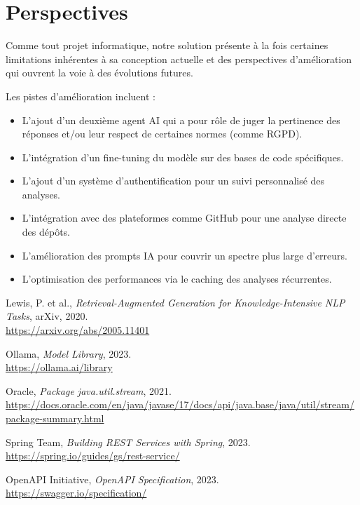 \documentclass[12pt,a4paper]{report}
\begin{document}
	\section*{Perspectives}
	
	Comme tout projet informatique, notre solution présente à la fois certaines limitations inhérentes à sa conception actuelle et des perspectives d'amélioration qui ouvrent la voie à des évolutions futures.
	
	Les pistes d'amélioration incluent :
	
	\begin{itemize}
		
		\item L'ajout d'un deuxième agent AI qui a pour rôle de juger la pertinence des réponses et/ou leur respect de certaines normes (comme RGPD).
		
		\item L’intégration d’un fine-tuning du modèle sur des bases de code spécifiques.
		
		\item L'ajout d'un système d'authentification pour un suivi personnalisé des analyses.
		
		\item  L'intégration avec des plateformes comme GitHub pour une analyse directe des dépôts. 
		
		\item L'amélioration des prompts IA pour couvrir un spectre plus large d'erreurs.
	
		\item L'optimisation des performances via le caching des analyses récurrentes.
		
	\end{itemize}
	
	\clearpage
	
	\begin{thebibliography}{9}  %
		
		Lewis, P. et al., \emph{Retrieval-Augmented Generation for Knowledge-Intensive NLP Tasks}, arXiv, 2020. \\
		\url{https://arxiv.org/abs/2005.11401}
		
		Ollama, \emph{Model Library}, 2023. \\
		\url{https://ollama.ai/library}
		
		Oracle, \emph{Package java.util.stream}, 2021. \\
		\url{https://docs.oracle.com/en/java/javase/17/docs/api/java.base/java/util/stream/package-summary.html}
		
		Spring Team, \emph{Building REST Services with Spring}, 2023. \\
		\url{https://spring.io/guides/gs/rest-service/}
		
		OpenAPI Initiative, \emph{OpenAPI Specification}, 2023. \\
		\url{https://swagger.io/specification/}
		
	\end{thebibliography}
	
\end{document}
